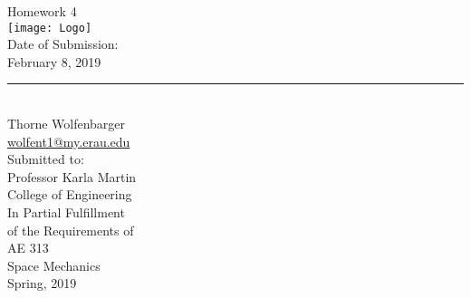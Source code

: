 \begin{center}
  {\huge Homework 4}\\
  \vspace{10px}
  \texttt{[image: Logo]} \\
  Date of Submission:\\
  February 8, 2019\\
  \vspace{30px}
  \rule{300px}{0.5px} \\
  Thorne Wolfenbarger \\
  \href{mailto:wolfent1@my.erau.edu}{wolfent1@my.erau.edu} \\
  \vspace{30px}
  Submitted to: \\
  Professor Karla Martin \\
  College of Engineering \\
  \vspace{40px}
  In Partial Fulfillment \\
  of the Requirements of \\
  \vspace{10px}
  AE 313 \\
  Space Mechanics \\
  Spring, 2019 \\
\end{center}
